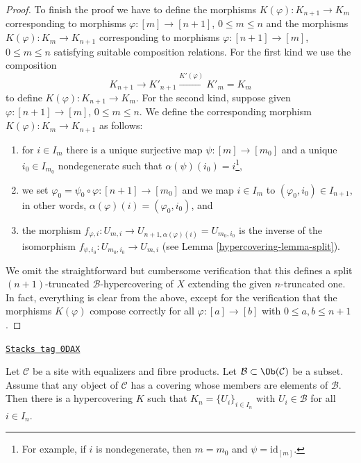 \begin{proof}
\medskip\noindent
To finish the proof we have to define the morphisms
$K(\varphi) : K_{n + 1} \to K_m$ corresponding to morphisms
$\varphi : [m] \to [n + 1]$, $0 \leq m \leq n$ and the morphisms
$K(\varphi) : K_m \to K_{n + 1}$ corresponding to morphisms
$\varphi : [n + 1] \to [m]$, $0 \leq m \leq n$
satisfying suitable composition relations.
For the first kind we use the composition
$$
K_{n + 1} \to K'_{n + 1} \xrightarrow{K'(\varphi)} K'_m = K_m
$$
to define $K(\varphi) : K_{n + 1} \to K_m$.
For the second kind, suppose given $\varphi : [n + 1] \to [m]$,
$0 \leq m \leq n$. We define the corresponding morphism
$K(\varphi) : K_m \to K_{n + 1}$ as follows:
\begin{enumerate}
\item for $i \in I_m$ there is a unique surjective map
$\psi : [m] \to [m_0]$ and a unique $i_0 \in I_{m_0}$ nondegenerate
such that $\alpha(\psi)(i_0) = i$\footnote{For example, if $i$ is
nondegenerate, then $m = m_0$ and $\psi = \text{id}_{[m]}$.},
\item we set $\varphi_0 = \psi_0 \circ \varphi : [n + 1] \to [m_0]$
and we map
$i \in I_m$ to $(\varphi_0, i_0) \in I_{n + 1}$, in other words,
$\alpha(\varphi)(i) = (\varphi_0, i_0)$, and
\item the morphism
$f_{\varphi, i} : U_{m, i} \to U_{n + 1, \alpha(\varphi)(i)} = U_{m_0, i_0}$
is the inverse of the isomorphism $f_{\psi, i_0} : U_{m_0, i_0} \to U_{m, i}$
(see Lemma \ref{hypercovering-lemma-split}).
\end{enumerate}
We omit the straightforward but cumbersome verification that this defines
a split $(n + 1)$-truncated $\mathcal{B}$-hypercovering of $X$
extending the given $n$-truncated one. In fact, everything is clear
from the above, except for the verification that the morphisms
$K(\varphi)$ compose correctly for all $\varphi : [a] \to [b]$
with $0 \leq a, b \leq n + 1$.
\end{proof}

\begin{lemma}
\label{hypercovering-lemma-hypercovering-site}
\href{https://stacks.math.columbia.edu/tag/0DAX}{\texttt{Stacks tag 0DAX}}

Let $\mathcal{C}$ be a site with equalizers and fibre products.
Let $\mathcal{B} \subset \Ob(\mathcal{C})$ be a subset. Assume
that any object of $\mathcal{C}$ has a covering
whose members are elements of $\mathcal{B}$.
Then there is a hypercovering $K$ such that
$K_n = \{U_i\}_{i \in I_n}$ with $U_i \in \mathcal{B}$
for all $i \in I_n$.
\end{lemma}

